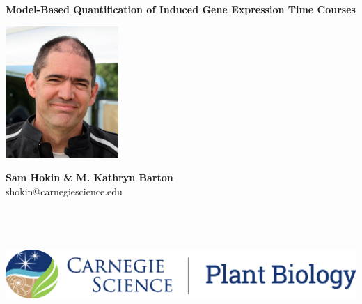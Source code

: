 \documentclass[aspb,landscape]{a0poster}
\begin{document}


\textbf{\color{CarnegiePriBlue} \VeryHuge Model-Based Quantification of Induced Gene Expression Time Courses}    %

\begin{minipage}[m]{0.08\linewidth}
  \includegraphics[height=50mm]{sam-bfr-smiling-crop.jpg} %
\end{minipage}
\begin{minipage}[m]{0.40\linewidth}                      %
  \color{Black}
  \Huge \textbf{Sam Hokin \& M. Kathryn Barton} \\
  \Large shokin@carnegiescience.edu
\end{minipage}
\hfill
\begin{minipage}[m]{0.40\linewidth}                      %
  \hfill
  \includegraphics[height=50mm]{CS_plantbio_logo_horz.eps} %
\end{minipage}
\end{document}
